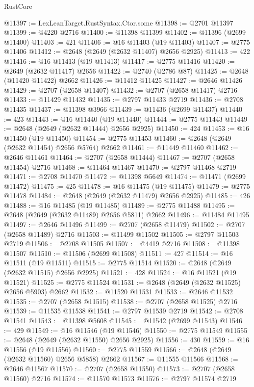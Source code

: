 \begin{lexlean}{RustCore}
\begin{coremodule}
@11397 := LexLeanTarget.RustSyntax.Ctor.some
@11398 := @2701 @11397
@11399 := @4220 @2716
@11400 := @11398 @11399
@11402 := @11396 (@2699 @11400)
@11403 := 421
@11406 := @16 @11403 (@19 @11403)
@11407 := @2775 @11406
@11412 := @2648 (@2649 (@2632 @11407) @2656 @2925)
@11413 := 422
@11416 := @16 @11413 (@19 @11413)
@11417 := @2775 @11416
@11420 := @2649 (@2632 @11417) @2656
@11422 := @2740 (@2786 @87)
@11425 := @2648 (@11420 @11422) @2662
@11426 := @11412 @11425
@11427 := @2646 @11426
@11429 := @2707 (@2658 @11407)
@11432 := @2707 (@2658 @11417) @2716
@11433 := @11429 @11432
@11435 := @2797 @11433 @2719
@11436 := @2708 @11435
@11437 := @11398 @3966
@11439 := @11436 (@2699 @11437)
@11440 := 423
@11443 := @16 @11440 (@19 @11440)
@11444 := @2775 @11443
@11449 := @2648 (@2649 (@2632 @11444) @2656 @2925)
@11450 := 424
@11453 := @16 @11450 (@19 @11450)
@11454 := @2775 @11453
@11460 := @2648 (@2649 (@2632 @11454) @2656 @5764) @2662
@11461 := @11449 @11460
@11462 := @2646 @11461
@11464 := @2707 (@2658 @11444)
@11467 := @2707 (@2658 @11454) @2716
@11468 := @11464 @11467
@11470 := @2797 @11468 @2719
@11471 := @2708 @11470
@11472 := @11398 @5649
@11474 := @11471 (@2699 @11472)
@11475 := 425
@11478 := @16 @11475 (@19 @11475)
@11479 := @2775 @11478
@11484 := @2648 (@2649 (@2632 @11479) @2656 @2925)
@11485 := 426
@11488 := @16 @11485 (@19 @11485)
@11489 := @2775 @11488
@11495 := @2648 (@2649 (@2632 @11489) @2656 @5811) @2662
@11496 := @11484 @11495
@11497 := @2646 @11496
@11499 := @2707 (@2658 @11479)
@11502 := @2707 (@2658 @11489) @2716
@11503 := @11499 @11502
@11505 := @2797 @11503 @2719
@11506 := @2708 @11505
@11507 := @4419 @2716
@11508 := @11398 @11507
@11510 := @11506 (@2699 @11508)
@11511 := 427
@11514 := @16 @11511 (@19 @11511)
@11515 := @2775 @11514
@11520 := @2648 (@2649 (@2632 @11515) @2656 @2925)
@11521 := 428
@11524 := @16 @11521 (@19 @11521)
@11525 := @2775 @11524
@11531 := @2648 (@2649 (@2632 @11525) @2656 @5903) @2662
@11532 := @11520 @11531
@11533 := @2646 @11532
@11535 := @2707 (@2658 @11515)
@11538 := @2707 (@2658 @11525) @2716
@11539 := @11535 @11538
@11541 := @2797 @11539 @2719
@11542 := @2708 @11541
@11543 := @11398 @5608
@11545 := @11542 (@2699 @11543)
@11546 := 429
@11549 := @16 @11546 (@19 @11546)
@11550 := @2775 @11549
@11555 := @2648 (@2649 (@2632 @11550) @2656 @2925)
@11556 := 430
@11559 := @16 @11556 (@19 @11556)
@11560 := @2775 @11559
@11566 := @2648 (@2649 (@2632 @11560) @2656 @5858) @2662
@11567 := @11555 @11566
@11568 := @2646 @11567
@11570 := @2707 (@2658 @11550)
@11573 := @2707 (@2658 @11560) @2716
@11574 := @11570 @11573
@11576 := @2797 @11574 @2719

\end{coremodule}
\end{lexlean}
